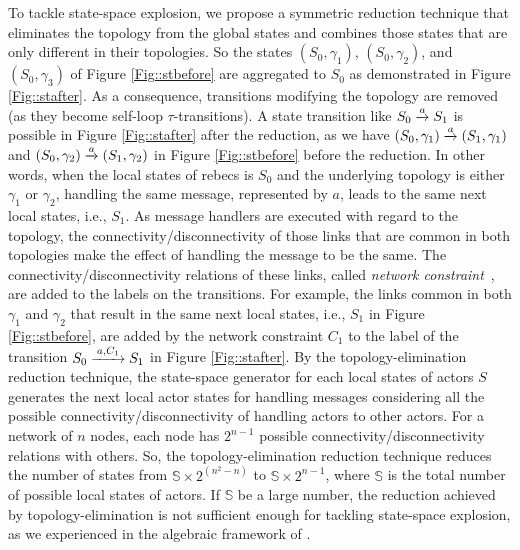 To tackle state-space explosion, we propose a symmetric reduction technique that eliminates the topology from the global states and combines those states that are only different in their topologies.  So the states $(S_0,\gamma_1)$, $(S_0,\gamma_2)$, and $(S_0,\gamma_3)$ of Figure \ref{Fig::stbefore} are aggregated to $S_0$ as demonstrated in Figure \ref{Fig::stafter}. As a consequence, transitions modifying the topology are removed (as they become self-loop $\tau$-transitions). 
A state transition like $S_0\overto{a} S_1$ is possible in Figure \ref{Fig::stafter} after the reduction, as we have $(S_0,\gamma_1)\overto{a}(S_1,\gamma_1)$ and $(S_0,\gamma_2)\overto{a}(S_1,\gamma_2)$ in Figure \ref{Fig::stbefore} before the reduction. In other words, when the local states of rebecs is $S_0$ and the underlying topology is either $\gamma_1$ or $\gamma_2$, handling the same message, represented by $a$, leads to the same next local states, i.e., $S_1$.  As message handlers are executed with regard to the topology, the connectivity/disconnectivity of those links that are common in both topologies make the effect of handling the message to be the same. The connectivity/disconnectivity relations of these links, called \emph{network constraint}~\cite{FatemehFI10,FatemehFI19},  are added to the labels on the transitions. For example, the links common in both $\gamma_{1}$ and $\gamma_{2}$ that result in the same next local states, i.e., $S_1$ in Figure \ref{Fig::stbefore}, are added by the network constraint $C_1$ to the label of the transition $S_0\overto{a,C_1}S_1$ in Figure \ref{Fig::stafter}. %
By the topology-elimination reduction technique, the state-space generator for each local states of actors $S$ %
generates the next local actor states for handling messages
considering all the possible connectivity/disconnectivity of handling actors to other actors. For a network of $n$ nodes, each node has $2^{n-1}$ possible connectivity/disconnectivity relations with others. So, the topology-elimination reduction technique reduces the number of states from $\mathbb{S}\times 2^{(n^2-n)}$ to $\mathbb{S}\times2^{n-1}$, where $\mathbb{S}$ is the total number of possible local states of actors. If $\mathbb{S}$ be a large number, the reduction achieved by topology-elimination is not sufficient enough for tackling state-space explosion, as we experienced in the algebraic framework of \cite{FORM}. 
